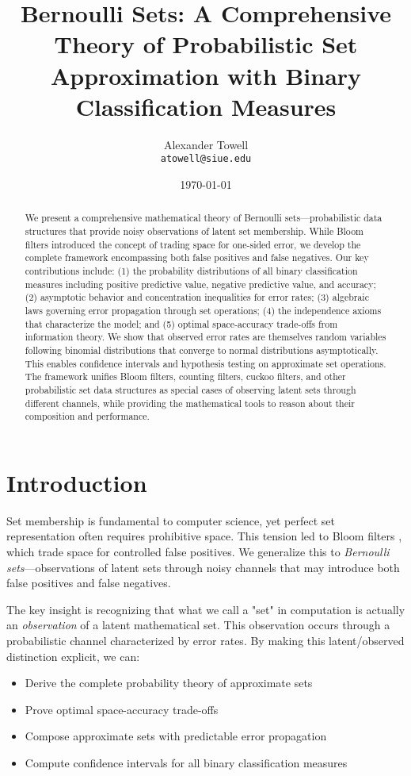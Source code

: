 \documentclass[11pt,final,hidelinks]{article}
\title{Bernoulli Sets: A Comprehensive Theory of Probabilistic Set Approximation with Binary Classification Measures}
\author{
    Alexander Towell\\
    \texttt{atowell@siue.edu}
}
\date{\today}
\begin{document}
\maketitle

\begin{abstract}
We present a comprehensive mathematical theory of Bernoulli sets—probabilistic data structures that provide noisy observations of latent set membership. While Bloom filters introduced the concept of trading space for one-sided error, we develop the complete framework encompassing both false positives and false negatives. Our key contributions include: (1) the probability distributions of all binary classification measures including positive predictive value, negative predictive value, and accuracy; (2) asymptotic behavior and concentration inequalities for error rates; (3) algebraic laws governing error propagation through set operations; (4) the independence axioms that characterize the model; and (5) optimal space-accuracy trade-offs from information theory. We show that observed error rates are themselves random variables following binomial distributions that converge to normal distributions asymptotically. This enables confidence intervals and hypothesis testing on approximate set operations. The framework unifies Bloom filters, counting filters, cuckoo filters, and other probabilistic set data structures as special cases of observing latent sets through different channels, while providing the mathematical tools to reason about their composition and performance.
\end{abstract}

\section{Introduction}

Set membership is fundamental to computer science, yet perfect set representation often requires prohibitive space. This tension led to Bloom filters \cite{bloom1970}, which trade space for controlled false positives. We generalize this to \textit{Bernoulli sets}—observations of latent sets through noisy channels that may introduce both false positives and false negatives.

The key insight is recognizing that what we call a "set" in computation is actually an \textit{observation} of a latent mathematical set. This observation occurs through a probabilistic channel characterized by error rates. By making this latent/observed distinction explicit, we can:
\begin{itemize}
\item Derive the complete probability theory of approximate sets
\item Prove optimal space-accuracy trade-offs
\item Compose approximate sets with predictable error propagation
\item Compute confidence intervals for all binary classification measures
\end{itemize}
\end{document}
